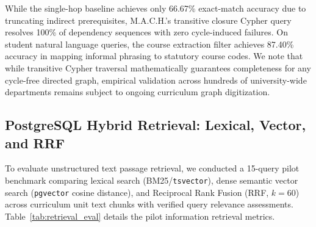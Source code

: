 \documentclass[conference]{IEEEtran}
\newcommand{\code}[1]{\texttt{\small #1}}
\begin{document}
\begin{table}[htbp]
\caption{Prerequisite Traversal and Course Resolution Benchmarks}
\label{tab:prereq_eval}
\centering
{}
\end{table}

While the single-hop baseline achieves only 66.67\% exact-match accuracy due to truncating indirect prerequisites, M.A.C.H.'s transitive closure Cypher query resolves 100\% of dependency sequences with zero cycle-induced failures. On student natural language queries, the course extraction filter achieves 87.40\% accuracy in mapping informal phrasing to statutory course codes. We note that while transitive Cypher traversal mathematically guarantees completeness for any cycle-free directed graph, empirical validation across hundreds of university-wide departments remains subject to ongoing curriculum graph digitization.

\subsection{PostgreSQL Hybrid Retrieval: Lexical, Vector, and RRF}
To evaluate unstructured text passage retrieval, we conducted a 15-query pilot benchmark comparing lexical search (BM25/\code{tsvector}), dense semantic vector search (\texttt{pgvector} cosine distance), and Reciprocal Rank Fusion (RRF, $k=60$) across curriculum unit text chunks with verified query relevance assessments. Table~\ref{tab:retrieval_eval} details the pilot information retrieval metrics.
\end{document}
